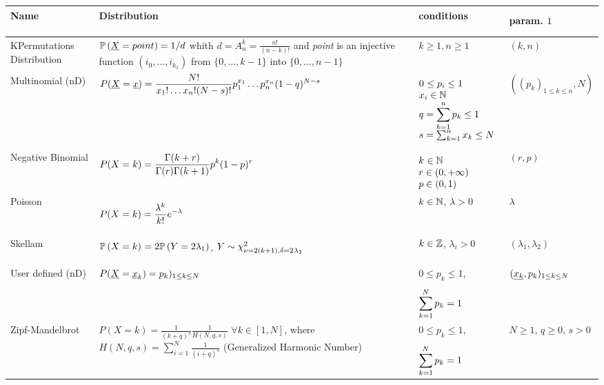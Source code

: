 {\footnotesize
  \noindent \begin{tabular}{|p{2cm}|p{8cm}|p{4cm}|p{2cm}|}
    \hline
    Name & Distribution & \multicolumn{1}{l|}{conditions} & param. $1^{\strut}_{\strut}$\\
    \hline
    KPermutations Distribution & $\displaystyle {\mathbb P}\left( {\underline{X}} =
      point \right)=1/d$ whith $d=A_n^k=\displaystyle \frac{n!}{(n-k)!}$
    and \textit{point} is an injective function $(i_0, \hdots, i_{k_1})$ from $\{0, \dots, k-1\}$ into $\{0, \dots, n-1\}$ &
    $k \geq 1, n\geq 1$ & $(k,n)$\\
    \hline
    Multinomial (nD) & $\displaystyle P({\underline{X}} = {\underline{x}}) = \frac{N!}{x_1!\dots x_n! (N-s)!}p_1^{x_1}\dots p_n^{x_n}(1-q)^{N-s}$ &
    $\begin{array}{@{}l@{}}
      0^{\strut}\leq p_i \leq 1 \\
      x_i\in \Nset \\
      \displaystyle q = \sum_{k=1}^n p_k \leq 1 \\
      s=  \sum_{k=1}^n x_k \leq N_{\strut}
    \end{array}
    $
    & $((p_k)_{1 \leq k \leq n}, N)$\\
    \hline
    Negative Binomial & $\displaystyle P(X = k) = \frac{\Gamma(k + r)}{\Gamma(r)\Gamma(k+1)}p^k (1-p)^{r^{\strut}}$ &
    $\begin{array}{@{}l@{}}
      k^{\strut} \in \Nset\\
      r \in (0,+\infty) \\
      p \in (0,1)
    \end{array}
    $
    & $(r,p)$\\
    \hline
    Poisson & $ \displaystyle P(X = k) =  \frac{\lambda^{k^{\strut}}}{k!_{\strut}}e^{-\lambda}$ & $k \in {\mathbb N}$, $\lambda >0$ & $\lambda$ \\
    \hline
    Skellam & $ \displaystyle {\mathbb P}\left( X = k \right)^{\strut} = 2{\mathbb P}\left( Y=2\lambda_1 \right)$, $Y \sim  \chi^2_{\nu=2(k+1), \delta=2_{\strut}\lambda_2}$& $k \in {\mathbb Z}$, $\lambda_i >0$ & $(\lambda_1, \lambda_2)$ \\
    \hline
    User defined (nD) &  $P({\underline{X}} = {\underline{x}}_k) = p_k)_{1 \leq k \leq N}$ & $0\leq p_k \leq 1$, $\displaystyle \sum_{k=1}^{N^{\strut}} p_k = 1$ & $({\underline{x_k}}, p_k)_{1 \leq k \leq N}$\\
    \hline
    Zipf-Mandelbrot &  $P(X=k) = \frac{1}{(k+q)^s} \frac{1}{H(N,q,s)}$ $ \forall k\in [1,N]$, where $H(N,q,s) = \sum_{i=1}^{N} \displaystyle \frac{1}{(i+q)^s}$ (Generalized Harmonic Number) & $0\leq p_k \leq 1$, $\displaystyle \sum_{k=1}^{N^{\strut}} p_k = 1$ & $N \geq 1$, $q \geq 0$, $s>0$ \\
    \hline
  \end{tabular}
}

